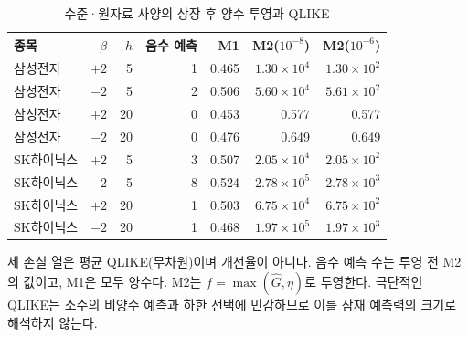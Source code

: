 \begin{table}[htbp]\centering\small
\caption{수준·원자료 사양의 상장 후 양수 투영과 QLIKE}\label{tab:qlike_projection}
\begin{tabular}{lrrrrrr}\toprule
종목 & $\beta$ & $h$ & 음수 예측 & M1 & M2($10^{-8}$) & M2($10^{-6}$)\\\midrule
삼성전자 & $+2$ & 5 & 1 & 0.465 & $1.30\times10^{4}$ & $1.30\times10^{2}$\\
삼성전자 & $-2$ & 5 & 2 & 0.506 & $5.60\times10^{4}$ & $5.61\times10^{2}$\\
삼성전자 & $+2$ & 20 & 0 & 0.453 & 0.577 & 0.577\\
삼성전자 & $-2$ & 20 & 0 & 0.476 & 0.649 & 0.649\\
SK하이닉스 & $+2$ & 5 & 3 & 0.507 & $2.05\times10^{4}$ & $2.05\times10^{2}$\\
SK하이닉스 & $-2$ & 5 & 8 & 0.524 & $2.78\times10^{5}$ & $2.78\times10^{3}$\\
SK하이닉스 & $+2$ & 20 & 1 & 0.503 & $6.75\times10^{4}$ & $6.75\times10^{2}$\\
SK하이닉스 & $-2$ & 20 & 1 & 0.468 & $1.97\times10^{5}$ & $1.97\times10^{3}$\\
\bottomrule\end{tabular}
\smallskip
\begin{minipage}{0.97\textwidth}\footnotesize 세 손실 열은 평균 QLIKE(무차원)이며 개선율이 아니다. 음수 예측 수는 투영 전 M2의 값이고, M1은 모두 양수다. M2는 $f=\max(\widehat G,\eta)$로 투영한다. 극단적인 QLIKE는 소수의 비양수 예측과 하한 선택에 민감하므로 이를 잠재 예측력의 크기로 해석하지 않는다.\end{minipage}
\end{table}

